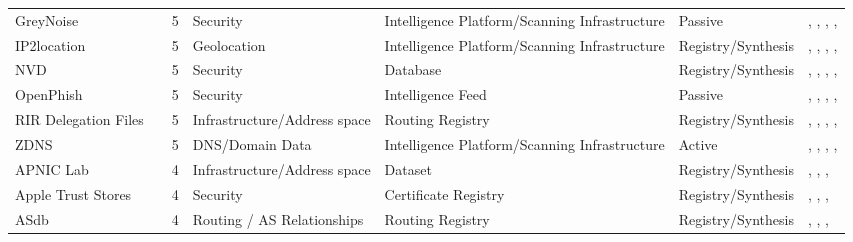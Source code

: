 \documentclass[11pt,a4paper]{article}
\begin{document}
\begin{longtable}{@{}p{}p{}p{}p{}p{}p{}p{}@{}}
GreyNoise & \cite{greynoise_data} & 5 & Security & Intelligence Platform/Scanning Infrastructure & Passive & \cite{10.1145/3646547.3689012}, \cite{10.1145/3618257.3624818}, \cite{10.1145/3487552.3487833}, \cite{10.1145/3487552.3487840}, \cite{10.1145/3777912.3839790} \\
IP2location & \cite{ip2location} & 5 & Geolocation & Intelligence Platform/Scanning Infrastructure & Registry/Synthesis & \cite{10.1145/3517745.3561423}, \cite{10.1007/978-3-030-98785-5_6}, \cite{10.1007/978-3-031-56252-5_1}, \cite{10.1007/978-3-032-18268-5_9}, \cite{10.1145/3777912.3809136} \\
NVD & \cite{nvd-nist} & 5 & Security & Database & Registry/Synthesis & \cite{10.1145/3618257.3624804}, \cite{10.1145/3618257.3624810}, \cite{10.1145/3487552.3487833}, \cite{10.1007/978-3-030-72582-2_5}, \cite{10.1007/978-3-030-98785-5_30} \\
OpenPhish & \cite{openphish} & 5 & Security & Intelligence Feed & Passive & \cite{10.1145/3517745.3561467}, \cite{10.1007/978-3-031-28486-1_20}, \cite{10.1007/978-3-031-28486-1_24}, \cite{10.1007/978-3-031-28486-1_26}, \cite{10.1007/978-3-031-56249-5_9} \\
RIR Delegation Files & \cite{rir-delegation-files} & 5 & Infrastructure/Address space & Routing Registry & Registry/Synthesis & \cite{10.1145/3730567.3764449}, \cite{10.1145/3487552.3487825}, \cite{10.1007/978-3-030-98785-5_29}, \cite{10.1145/3777912.3839831}, \cite{10.1145/3777912.3809155} \\
ZDNS & \cite{zdns} & 5 & DNS/Domain Data & Intelligence Platform/Scanning Infrastructure & Active & \cite{10.1145/3646547.3688449}, \cite{10.1007/978-3-031-56249-5_5}, \cite{10.1007/978-3-031-85960-1_3}, \cite{10.1145/3777912.3839830}, \cite{10.1145/3777912.3839828} \\
APNIC Lab & \cite{apnic_lab} & 4 & Infrastructure/Address space & Dataset & Registry/Synthesis & \cite{10.1145/3646547.3688411}, \cite{10.1145/3777912.3809137}, \cite{10.1145/3777912.3839801}, \cite{10.1145/3777912.3809144} \\
Apple Trust Stores & \cite{apple_trust_store} & 4 & Security & Certificate Registry & Registry/Synthesis & \cite{10.1145/3618257.3624815}, \cite{10.1145/3646547.3688415}, \cite{10.1007/978-3-030-72582-2_11}, \cite{10.1007/978-3-031-28486-1_4} \\
ASdb & \cite{10.1145/3487552.3487853} & 4 & Routing / AS Relationships & Routing Registry & Registry/Synthesis & \cite{10.1145/3730567.3764481}, \cite{10.1145/3730567.3732917}, \cite{10.1145/3618257.3624811}, \cite{10.1145/3777912.3809155} \\

\end{longtable}
\end{document}
